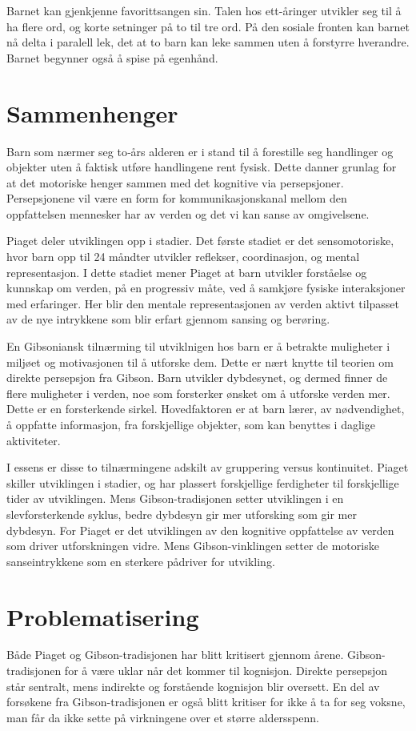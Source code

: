 \documentclass[12pt, a4paper]{article}
\begin{document}
Barnet kan gjenkjenne favorittsangen sin. 
Talen hos ett-åringer utvikler seg til å ha flere ord, og korte setninger på to
til tre ord. 
På den sosiale fronten kan barnet nå delta i paralell lek, det at to barn kan
leke sammen uten å forstyrre hverandre. Barnet begynner også å spise på
egenhånd. 

\section{Sammenhenger} %
Barn som nærmer seg to‐års alderen er i stand til å forestille seg
handlinger og objekter uten å faktisk utføre handlingene rent fysisk.
Dette danner grunlag for at det motoriske henger sammen med det kognitive via
persepsjoner. Persepsjonene vil være en form for kommunikasjonskanal mellom den
oppfattelsen mennesker har av verden og det vi kan sanse av omgivelsene. 

Piaget deler utviklingen opp i stadier. Det første stadiet er det
sensomotoriske, hvor barn opp til 24 måndter utvikler reflekser, coordinasjon,
og mental representasjon. I dette stadiet mener Piaget at barn utvikler
forståelse og kunnskap om verden, på en progressiv måte, ved å samkjøre fysiske
interaksjoner med erfaringer. Her blir den mentale representasjonen av verden
aktivt tilpasset av de nye intrykkene som blir erfart gjennom sansing og
berøring. 

En Gibsoniansk tilnærming til utviklnigen hos barn er å betrakte
muligheter i miljøet og motivasjonen til å utforske dem. Dette er nært knytte
til teorien om direkte persepsjon fra Gibson. Barn utvikler dybdesynet, og
dermed finner de flere muligheter i verden, noe som forsterker ønsket om å
utforske verden mer. Dette er en forsterkende sirkel.  
Hovedfaktoren er at barn lærer, av nødvendighet, å oppfatte informasjon, fra forskjellige
objekter, som kan benyttes i daglige aktiviteter.  

I essens er disse to tilnærmingene adskilt av gruppering versus kontinuitet.
Piaget skiller utviklingen i stadier, og har plassert forskjellige ferdigheter
til forskjellige tider av utviklingen. Mens Gibson-tradisjonen setter
utviklingen i en slevforsterkende syklus, bedre dybdesyn gir mer utforsking som
gir mer dybdesyn. For Piaget er det utviklingen av den kognitive oppfattelse av
verden som driver utforskningen vidre. Mens Gibson-vinklingen setter de
motoriske sanseintrykkene som en sterkere pådriver for utvikling. 

\section{Problematisering} %
Både Piaget og Gibson-tradisjonen har blitt kritisert gjennom årene.
Gibson-tradisjonen for å være uklar når det kommer til kognisjon. Direkte
persepsjon står sentralt, mens indirekte og forstående kognisjon blir oversett.   
En del av forsøkene fra Gibson-tradisjonen er også blitt kritiser for ikke å ta
for seg voksne, man får da ikke sette på virkningene over et større
aldersspenn.  
\end{document}
